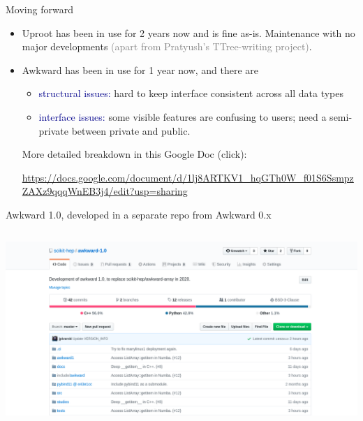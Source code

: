 \documentclass[aspectratio=169]{beamer}
\begin{document}
\begin{frame}{Moving forward}
\large
\vspace{0.5 cm}
\begin{itemize}\setlength{\itemsep}{0.75 cm}
\item Uproot has been in use for 2 years now and is fine as-is. Maintenance with no major developments \textcolor{gray}{(apart from Pratyush's TTree-writing project)}.

\item Awkward has been in use for 1 year now, and there are

\vspace{0.2 cm}
\begin{itemize}\setlength{\itemsep}{0.2 cm}
\item \large \textcolor{darkblue}{structural issues:} hard to keep interface consistent across all data types
\item \large \textcolor{darkblue}{interface issues:} some visible features are confusing to users; need a semi-private between private and public.
\end{itemize}

\vspace{0.2 cm}
More detailed breakdown in this Google Doc (click): \normalsize

\vspace{0.2 cm}
\textcolor{blue}{\url{https://docs.google.com/document/d/1lj8ARTKV1_hqGTh0W_f01S6SsmpzZAXz9qqqWnEB3j4/edit?usp=sharing}}
\end{itemize}
\end{frame}

\begin{frame}{Awkward 1.0, developed in a separate repo from Awkward 0.x}
\vspace{0.2 cm}
\begin{columns}
\includegraphics[width=\linewidth]{awkward-1-github.png}
\end{columns}
\end{frame}
\end{document}
